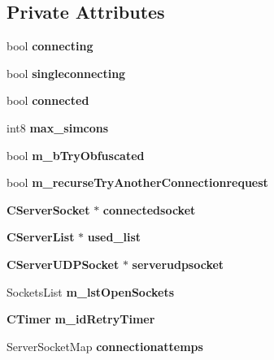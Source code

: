 \subsection*{Private Attributes}
\begin{DoxyCompactItemize}
\item 
bool {\bfseries connecting}\label{classCServerConnect_a42d05be2ab5cea482d33c3b2f809c404}

\item 
bool {\bfseries singleconnecting}\label{classCServerConnect_a7f5d8aaf2b1c1ba4ac4b77af9f23b95d}

\item 
bool {\bfseries connected}\label{classCServerConnect_a5ac88f9d1e1c057cd9db19af715c6ad6}

\item 
int8 {\bfseries max\_\-simcons}\label{classCServerConnect_aa13f89f12875eb676572108b16532ce1}

\item 
bool {\bfseries m\_\-bTryObfuscated}\label{classCServerConnect_aaee4623cb9afbeac698114c3d58aeb43}

\item 
bool {\bfseries m\_\-recurseTryAnotherConnectionrequest}\label{classCServerConnect_ad1b52267679944c1ec5106b4383a0498}

\item 
{\bf CServerSocket} $\ast$ {\bfseries connectedsocket}\label{classCServerConnect_abb178d79b66328e41d7b37e18dc2d4f7}

\item 
{\bf CServerList} $\ast$ {\bfseries used\_\-list}\label{classCServerConnect_a3e1bed5e7e1b1ddff4b9e3fc21c40b1c}

\item 
{\bf CServerUDPSocket} $\ast$ {\bfseries serverudpsocket}\label{classCServerConnect_a4a4983c4b26681c5682f41725bbc877e}

\item 
SocketsList {\bfseries m\_\-lstOpenSockets}\label{classCServerConnect_aef7697d33f89a2c3fc2cbc46d23eefd9}

\item 
{\bf CTimer} {\bfseries m\_\-idRetryTimer}\label{classCServerConnect_a0e177c55180ecc2d810603c14de35f09}

\item 
ServerSocketMap {\bfseries connectionattemps}\label{classCServerConnect_a9b5253f2f458701ab2882aa74ec8e46b}

\end{DoxyCompactItemize}


